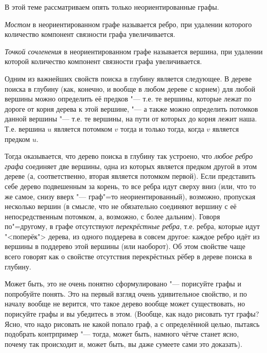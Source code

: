 В этой теме рассматриваем опять только неориентированные графы.

\textit{Мостом} в неориентированном графе называется ребро, при удалении которого количество компонент связности графа 
увеличивается. 

\textit{Точкой сочленения} в неориентированном графе называется вершина, при удалении которой количество компонент 
связности графа увеличивается.



 Одним из важнейших свойств поиска в глубину является следующее.
В дереве поиска в глубину (как, конечно, и вообще в любом дереве с корнем) для любой вершины
можно определить её предков "--- т.е. те вершины, которые лежат по дороге от корня дерева к этой 
вершине, "--- а также можно определить потомков данной вершины "--- т.е. те вершины, на пути от которых до 
корня лежит наша. Т.е. вершина $u$ является потомком $v$ тогда и только тогда, когда $v$ является предком $u$.

Тогда оказывается, что дерево поиска в глубину так устроено, что \textit{любое ребро графа} соединяет 
две вершины, одна из которых является предком другой в этом дереве (а, соответственно, вторая
является потомком первой). Если представить себе дерево подвешенным за корень, то все ребра идут сверху вниз
(или, что то же самое, снизу вверх "--- граф"=то неориентированный), возможно, пропуская несколько вершин
(в смысле, что не обязательно соединяют вершину с её непосредственным потомком, а, возможно, с более дальним).
Говоря по"=другому, в графе отсутствуют \textit{перекрёстные ребра}, т.е. ребра, которые идут "<поперёк">
дерева, из одного поддерева в совсем другое: каждое ребро идёт из вершины в поддерево этой
вершины (или наоборот). Об этом свойстве чаще всего говорят как о свойстве отсутствия перекрёстных рёбер в
дереве поиска в глубину.

Может быть, это не очень понятно сформулировано "--- порисуйте графы и попробуйте понять. Это на первый взгляд
очень удивительное свойство, и по началу вообще не верится, что такое дерево вообще может существовать, но 
порисуйте графы и вы убедитесь в этом. (Вообще, как надо рисовать тут графы? Ясно, что надо рисовать не какой 
попало граф, а с определённой целью, пытаясь подобрать контрпример "--- тогда, может быть, намного чётче станет
ясно, почему так происходит и, может быть, вы даже сумеете сами это доказать).

